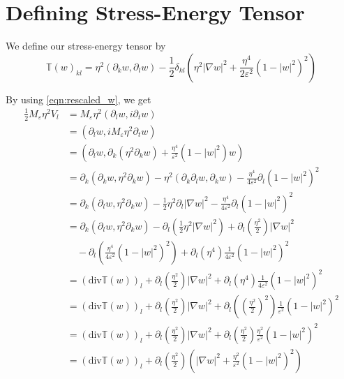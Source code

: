 \documentclass[a4paper]{article}
\renewcommand{\div}{\mathrm{div}}
\begin{document}
\section{Defining Stress-Energy Tensor}
We define our stress-energy tensor by
\begin{equation}
  \mathbb{T}(w)_{kl} = \eta^2 (\partial_k w, \partial_l w) -\frac{1}{2} \delta_{kl} \left( \eta^2 |\nabla w|^2 + \frac{\eta^4}{2 \varepsilon^2}
  (1-|w|^2)^2 \right)
  \label{eqn:stress_energy_tensor}
\end{equation}

By using \eqref{eqn:rescaled_w}, we get
\begin{align}
  \frac{1}{2} M_\varepsilon \eta^2 V_l &= M_\varepsilon \eta^2 (\partial_l w, i \partial_t w) \nonumber \\
  &= (\partial_l w, i M_\varepsilon \eta^2 \partial_t w) \nonumber \\
  &= ( \partial_l w, \partial_k (\eta^2 \partial_k w) + \frac{\eta^4}{\varepsilon^2} (1-|w|^2)w ) \nonumber \\
  &= \partial_k (\partial_k w, \eta^2 \partial_k w) - \eta^2 ( \partial_k \partial_l w, \partial_k w) - \frac{\eta^4}{4 \varepsilon^2} \partial_l
  (1-|w|^2)^2 \nonumber \\
  &= \partial_k (\partial_l w, \eta^2 \partial_k w) - \frac{1}{2} \eta^2 \partial_l | \nabla w |^2 - \frac{\eta^4}{4 \varepsilon^2} \partial_l
  (1-|w|^2)^2 \nonumber \\
  &= \partial_k ( \partial_l w, \eta^2 \partial_k w) - \partial_l (\frac{1}{2} \eta^2 | \nabla w |^2) + \partial_l \left( \frac{\eta^2}{2} \right) |
  \nabla w |^2 \nonumber \\
  &\quad - \partial_l \left( \frac{\eta^4}{4 \varepsilon^2} (1-|w|^2)^2 \right) + \partial_l (\eta^4) \frac{1}{4 \varepsilon^2} (1-|w|^2)^2 \nonumber
  \\
  &= (\div \mathbb{T}(w))_l + \partial_l \left( \frac{\eta^2}{2} \right) | \nabla w |^2 + \partial_l (\eta^4) \frac{1}{4\varepsilon^2} (1-|w|^2)^2
  \nonumber \\
  &= ( \div \mathbb{T}(w) )_l + \partial_l \left( \frac{\eta^2}{2} \right) | \nabla w |^2 + \partial_l \left( \left( \frac{\eta^2}{2} \right)^2
  \right) \frac{1}{\varepsilon^2} (1-|w|^2)^2 \nonumber \\
  &= ( \div \mathbb{T}(w) )_l + \partial_l \left( \frac{\eta^2}{2} \right) | \nabla w |^2 + \partial_l \left( \frac{\eta^2}{2} \right)
  \frac{\eta^2}{\varepsilon^2} (1-|w|^2)^2 \nonumber \\
  &= ( \div \mathbb{T}(w) )_l + \partial_l \left( \frac{\eta^2}{2} \right) \left( | \nabla w |^2 + \frac{\eta^2}{\varepsilon^2} (1-|w|^2)^2 \right)
  \label{eqn:vel_1}
\end{align}
\end{document}
